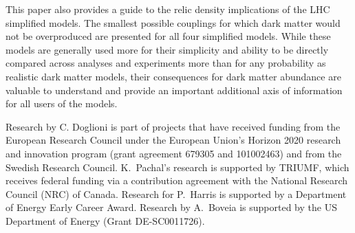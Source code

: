 \documentclass[a4paper, 11pt]{article}
\begin{document}
This paper also provides a guide to the relic density implications of the LHC simplified models. The smallest possible couplings for which dark matter would not be overproduced are presented for all four simplified models. While these models are generally used more for their simplicity and ability to be directly compared across analyses and experiments more than for any probability as realistic dark matter models, their consequences for dark matter abundance are valuable to understand and provide an important additional axis of information for all users of the models. 


\acknowledgments 

Research by C. Doglioni is part of projects that have received funding from the European Research Council under the European Union’s Horizon 2020 research and innovation program (grant agreement 679305 and 101002463) and from the Swedish Research Council.
K.~Pachal's research is supported by TRIUMF, which receives federal funding via a contribution agreement with the National Research Council (NRC) of Canada.
Research for P.~Harris is supported by a Department of Energy Early Career Award.
Research by A.~Boveia is supported by the US Department of Energy (Grant DE-SC0011726).








\end{document}
